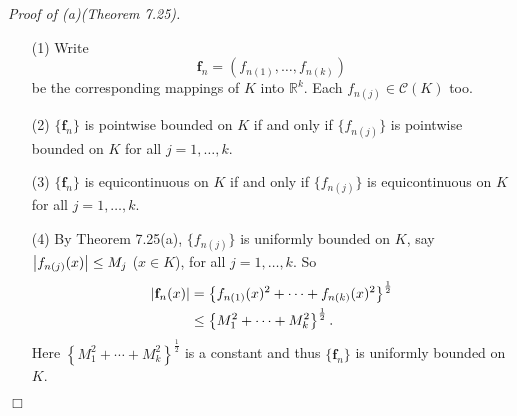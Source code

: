 \documentclass{article}
\begin{document}
\emph{Proof of (a)(Theorem 7.25).}
\begin{enumerate}
\item[(1)]
  Write
  \[
    \mathbf{f}_n = \left(f_{n(1)}, \ldots, f_{n(k)}\right)
  \]
  be the corresponding mappings of $K$ into $\mathbb{R}^k$.
  Each $f_{n(j)} \in \mathscr{C}(K)$ too.

\item[(2)]
  $\{\mathbf{f}_n\}$ is pointwise bounded on $K$
  if and only if
  $\{ f_{n(j)} \}$ is pointwise bounded on $K$ for all $j=1,\ldots,k$.

\item[(3)]
  $\{\mathbf{f}_n\}$ is equicontinuous on $K$
  if and only if
  $\{ f_{n(j)} \}$ is equicontinuous on $K$ for all $j=1,\ldots,k$.

\item[(4)]
  By Theorem 7.25(a),
  $\{ f_{n(j)} \}$ is uniformly bounded on $K$,
  say $\abs{f_{n(j)}(x)} \leq M_j$ ($x \in K$), for all $j=1,\ldots,k$.
  So
  \begin{align*}
    \abs{\mathbf{f}_n(x)}
    &= \left\{ f_{n(1)}(x)^2 + \cdots + f_{n(k)}(x)^2 \right\}^{\frac{1}{2}} \\
    &\leq \left\{ M_1^2 + \cdots + M_k^2 \right\}^{\frac{1}{2}}.
  \end{align*}
  Here $\left\{ M_1^2 + \cdots + M_k^2 \right\}^{\frac{1}{2}}$ is a constant
  and thus $\{\mathbf{f}_n\}$ is uniformly bounded on $K$.
  \end{enumerate}
$\Box$ \\
\end{document}
